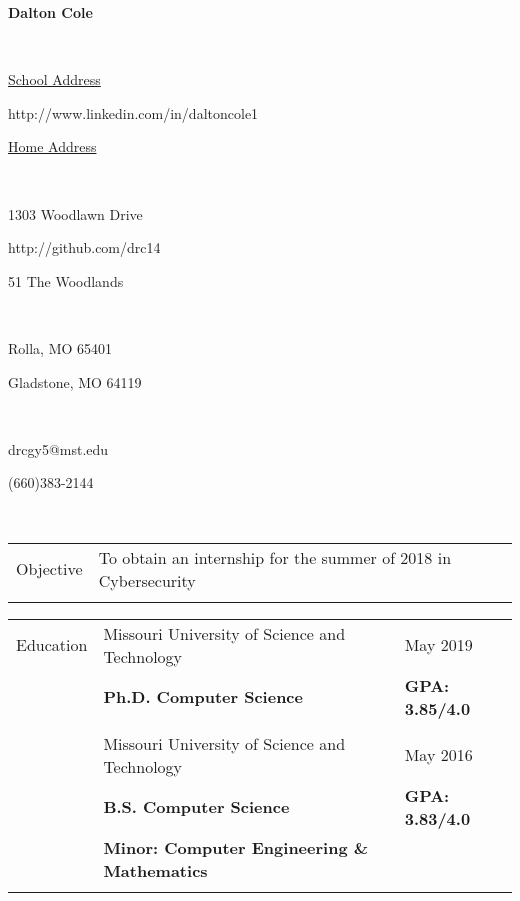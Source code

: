\documentclass[10.5pt, arial]{article}
\newcommand\textbox[1]{%
  \parbox{.333\textwidth}{#1}%
}
\begin{document}

\noindent\textbox{\hfill}\textbox{\hfil \textbf{Dalton Cole}\hfil}\textbox{\hfill} \\
\noindent\textbox{\underline{School Address}\hfill}\textbox{\hfil http://www.linkedin.com/in/daltoncole1\hfil}\textbox{\hfill \underline{Home Address}} \\
\noindent\textbox{1303 Woodlawn Drive\hfill}\textbox{\hfil http://github.com/drc14\hfil}\textbox{\hfill 51 The Woodlands} \\
\noindent\textbox{Rolla, MO 65401\hfill}\textbox{\hfil \hfil}\textbox{\hfill Gladstone, MO 64119} \\
\noindent\textbox{drcgy5@mst.edu\hfill}\textbox{\hfil \hfil}\textbox{\hfill (660)383-2144} \\
\noindent\makebox[\linewidth]{\rule{\textwidth}{.4pt}} 

\begin{tabular}{p{1.5cm} p{13.2cm} l}
Objective  	& To obtain an internship for the summer of 2018 in Cybersecurity 	& 						\\ \\
\end{tabular}

\begin{tabular}{p{1.5cm} p{13.2cm} l}
Education  	& Missouri University of Science and Technology 					& May 2019 				\\
			& \textbf{Ph.D. Computer Science} 									& \textbf{GPA: 3.85/4.0}	\\ \\

		  	& Missouri University of Science and Technology 					& May 2016 				\\
			& \textbf{B.S. Computer Science} 									& \textbf{GPA: 3.83/4.0} \\
			& \textbf{Minor: Computer Engineering \& Mathematics} 										\\ \\
\end{tabular}
\end{document}
